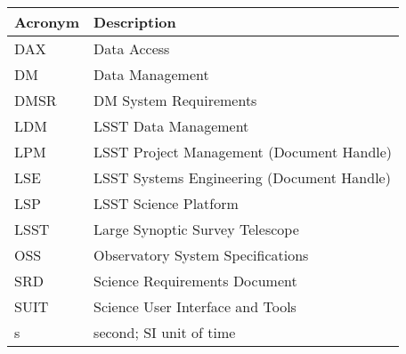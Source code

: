 \addtocounter{table}{-1}
\begin{longtable}{|l|p{}|}\hline
\textbf{Acronym} & \textbf{Description}  \\\hline

DAX & Data Access \\\hline
DM & Data Management \\\hline
DMSR & DM System Requirements \\\hline
LDM & LSST Data Management \\\hline
LPM & LSST Project Management (Document Handle) \\\hline
LSE & LSST Systems Engineering (Document Handle) \\\hline
LSP & LSST Science Platform \\\hline
LSST & Large Synoptic Survey Telescope \\\hline
OSS & Observatory System Specifications \\\hline
SRD & Science Requirements Document \\\hline
SUIT & Science User Interface and Tools \\\hline
s & second; SI unit of time \\\hline
\end{longtable}
